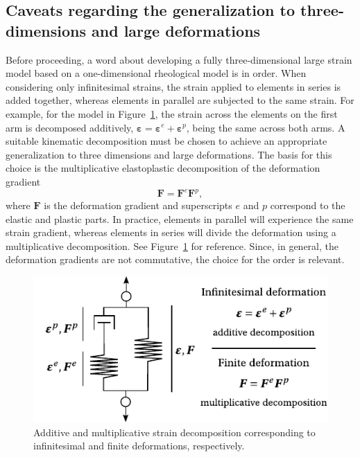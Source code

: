 
\subsection{Caveats regarding the generalization to three-dimensions and large deformations}
\label{sec:generalization_large_strains_3d}

Before proceeding, a word about developing a fully three-dimensional large strain model based on a one-dimensional rheological model is in order.
When considering only infinitesimal strains, the strain applied to elements in series is added together, whereas elements in parallel are subjected to the same strain.
For example, for the model in Figure~\ref{fig:gradient_decomp}, the strain across the elements on the first arm is decomposed additively, $\bm \varepsilon = \bm \varepsilon^e + \bm \varepsilon^p$, being the same across both arms.
A suitable kinematic decomposition must be chosen to achieve an appropriate generalization to three dimensions and large deformations.
The basis for this choice is the multiplicative elastoplastic decomposition of the deformation gradient \citep{desouzanetoComputationalMethodsPlasticity2008}
\begin{equation}
	\label{eq:mult_gradient_decomp}
\bm F = \bm F^e \bm F^p,
\end{equation}
where $\bm F$ is the deformation gradient and superscripts $e$ and $p$ correspond to the elastic and plastic parts.
In practice, elements in parallel will experience the same strain gradient, whereas elements in series will divide the deformation using a multiplicative decomposition.
See Figure~\ref{fig:gradient_decomp} for reference.
Since, in general, the deformation gradients are not commutative, the choice for the order is relevant.
\begin{figure}[hbtp]
	\centering
	\includegraphics{figures/gradient_decomp}
	\caption{Additive and multiplicative strain decomposition corresponding to infinitesimal and finite deformations, respectively.}
\label{fig:gradient_decomp}
\end{figure}

